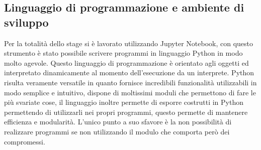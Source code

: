 \subsection{Linguaggio di programmazione e ambiente di sviluppo}
Per la totalità dello stage si è lavorato utilizzando Jupyter Notebook, con questo strumento è stato possibile scrivere programmi in linguaggio Python in modo molto agevole. Questo linguaggio di programmazione è orientato agli oggetti ed interpretato dinamicamente al momento dell’esecuzione da un interprete. Python risulta veramente versatile in quanto fornisce incredibili funzionalità utilizzabili in modo semplice e intuitivo, dispone di moltissimi moduli che permettono di fare le più svariate cose, il linguaggio inoltre permette di esporre costrutti  in Python permettendo di utilizzarli nei propri programmi, questo permette di mantenere efficienza e modularità. L'unico punto a suo sfavore è la non possibilità di realizzare programmi  se non utilizzando il modulo  che comporta però dei compromessi.

